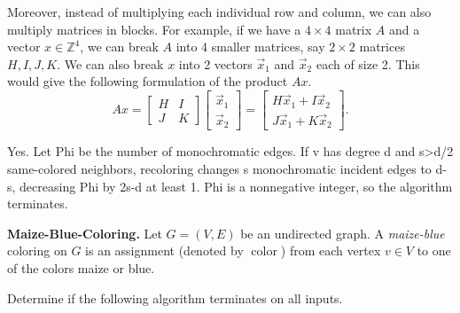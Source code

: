 \documentclass[11pt,addpoints,answers]{exam}
\DeclareMathOperator{\col}{color}
\begin{document}
\begin{questions}
   Moreover, instead of multiplying each individual row and column, we can also multiply matrices in blocks. For example, if we have a $4\times 4$ matrix $A$ and a vector $x\in \mathbb{Z}^4$, we can break $A$ into 4 smaller matrices, say $2\times2$ matrices $H, I, J, K$. We can also break $x$ into 2 vectors $\vec{x}_1$ and $\vec{x}_2$ each of size 2. This would give the following formulation of the product $Ax$.
    \begin{equation*}
       A x = 
       \begin{bmatrix}
       H & I \\
       J & K
       \end{bmatrix}
       \begin{bmatrix}
       \vec{x}_1 \\
       \vec{x}_2
       \end{bmatrix}
       = 
       \begin{bmatrix}
       H\vec{x}_1 + I\vec{x}_2 \\
       J\vec{x}_1 + K\vec{x}_2
       \end{bmatrix}.
   \end{equation*}

\begin{solution}
Yes. Let Phi be the number of monochromatic edges. If v has degree d and s>d/2 same-colored neighbors, recoloring changes s monochromatic incident edges to d-s, decreasing Phi by 2s-d at least 1. Phi is a nonnegative integer, so the algorithm terminates.
\end{solution}


   \question[20] \textbf{Maize-Blue-Coloring.} Let $G = (V,E)$ be an undirected graph. A \emph{maize-blue} coloring on $G$ is an assignment (denoted by $\col$) from each vertex $v \in V$ to one of the colors maize or blue.
    
    Determine if the following algorithm terminates on all inputs. 


    \begin{minipage}{\linewidth}
    \begin{algorithm}[H]
    \begin{algorithmic}[1]
        \Statex{}
        \EndFor
        \Statex{}
        \EndWhile
        \EndFunction
    \end{algorithmic}
    \end{algorithm}
    \end{minipage}


\end{questions}
\end{document}
